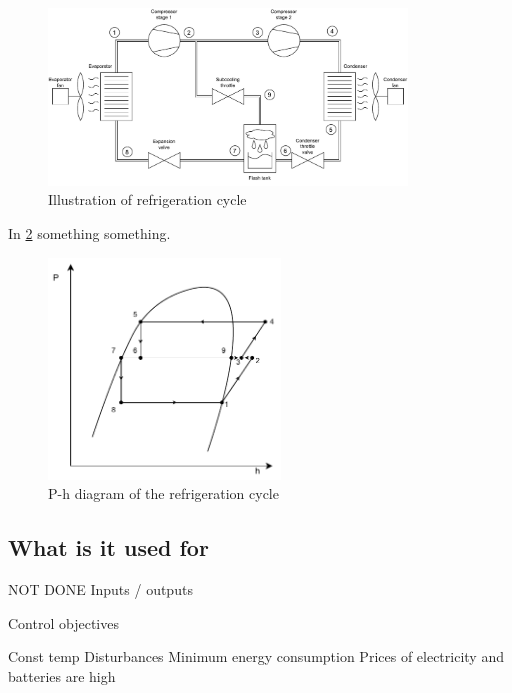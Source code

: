 \begin{figure}[h!]
	\centering
	\includegraphics[width=0.85\textwidth]{Graphics/HVAC_Diagram_Fans.pdf}
	\caption{Illustration of refrigeration cycle}
	\label{fig:HVAC_Diagram}
\end{figure}

In \cref{fig:p-h_diagram} something something.

\begin{figure}[h!]
	\centering
	\includegraphics[width=0.55\textwidth]{Graphics/Flash_Tank_P-h_Diagram}
	\caption{P-h diagram of the refrigeration cycle}
	\label{fig:p-h_diagram}
\end{figure}




\subsection{What is it used for}


	
NOT DONE
Inputs / outputs

Control objectives

	Const temp
		Disturbances
	Minimum energy consumption
		Prices of electricity and batteries are high
		
